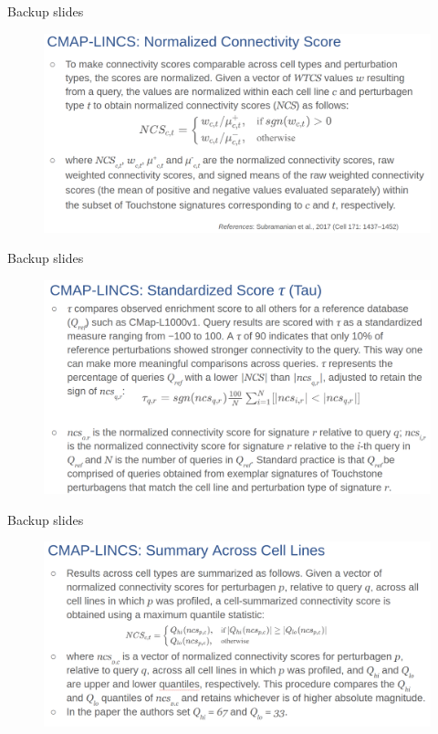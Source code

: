 \documentclass[10pt]{beamer}
\begin{document}
\begin{frame}[fragile]{Backup slides}
    \begin{figure}
        \includegraphics[width=12cm]{demo/images/cmap_lincs_ncs.png}
    \end{figure}
\end{frame}
\begin{frame}[fragile]{Backup slides}
    \begin{figure}
        \includegraphics[width=12cm]{demo/images/cmap_lincs_tau.png}
    \end{figure}
\end{frame}
\begin{frame}[fragile]{Backup slides}
    \begin{figure}
        \includegraphics[width=12cm]{demo/images/cmap_lincs_ncsct.png}
    \end{figure}
\end{frame}
\end{document}
